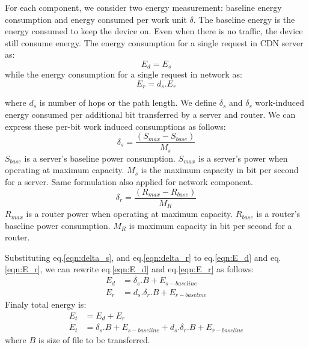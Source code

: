 \documentclass[JIP]{ipsj}
\begin{document}
For each component, we consider two energy measurement:  baseline energy consumption and energy consumed per work unit $\delta$.
The baseline energy is the energy consumed to keep the device on.
Even when there is no traffic, the device still consume energy.
The energy consumption for a single request in CDN server as:
\begin{equation}\label{eqn:E_d}
	E_{d} = E_s
\end{equation}
while the energy consumption for a single request in network as:
\begin{equation}\label{eqn:E_r}
	E_{r} = d_s.E_r
\end{equation}

where $d_s$ is number of hops or the path length.
We define $\delta_s$ and $\delta_r$ work-induced energy consumed per additional bit transferred by a server and router.   
We can express these per-bit work induced consumptions as follows:
\begin{equation}\label{eqn:delta_s}
	\delta_s = \frac{(S_{max} - S_{base})}{M_s} 
\end{equation}
$S_{base}$ is a server's baseline power consumption.  
$S_{max}$ is a server's power when operating at maximum capacity.
$M_s$ is the maximum capacity in bit per second for a server.
Same formulation also applied for network component.  
\begin{equation}\label{eqn:delta_r}
	\delta_r = \frac{(R_{max} - R_{base})}{M_R} 
\end{equation}
$R_{max}$ is a router power when operating at maximum capacity.
$R_{base}$ is a router's baseline power consumption.
$M_R$ is maximum capacity in bit per second for a router.

Substituting eq.\ref{eqn:delta_s}, and eq.\ref{eqn:delta_r} to eq.\ref{eqn:E_d} and eq.\ref{eqn:E_r}, we can rewrite eq.\ref{eqn:E_d} and eq.\ref{eqn:E_r} as follows:
\begin{equation}\label{eqn:E_d dan E_r}
\begin{split}
	E_{d} &= \delta_s .B + E_{s-baseline}\\
	E_{r} &= d_s.\delta_r.B + E_{r-baseline}
\end{split}
\end{equation}
Finaly total energy is:
\begin{equation}\label{eqn:E_t}
\begin{split}
	E_{t} &= E_d + E_r  \\
	E_{t} &= \delta_s.B + E_{s-baseline} + d_s.\delta_r.B + E_{r-baseline}
\end{split}
\end{equation}
where $B$ is size of file to be transferred. 
\end{document}
